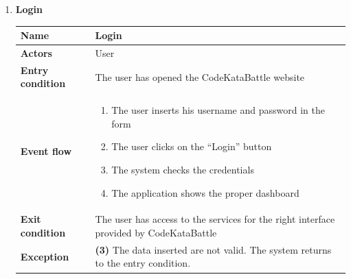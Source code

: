 \documentclass{article}
\begin{document}
        \begin{enumerate}[label=\textbf{UC\arabic*}:]
        \item \textbf{Login}
        \begin{center}
            \begin{tabular}{ | m{8em} | m{10cm}|  } 
            \hline 
            \textbf{Name} & Login\\[1ex] 
            \hline 
            \textbf{Actors} & User \\[1ex] 
            \hline 
            \textbf{Entry condition} & The user has opened the CodeKataBattle website\\[1ex] 
            \hline \textbf{Event flow} & \begin{enumerate}[label=\textbf{\arabic*}:]
                \item The user inserts his username and password in the form
                \item The user clicks on the “Login” button
                \item The system checks the credentials
                \item The application shows the proper dashboard
                \end{enumerate} \\[1ex]
            \hline \textbf{Exit condition} & The user has access to the services for the right interface provided by CodeKataBattle \\[1ex]
            \hline \textbf{Exception} & \textbf{(3)} The data inserted are not valid. The system returns to the entry condition. \\[1ex]
            \hline
\end{tabular}
\end{center}


\end{enumerate}
\end{document}

